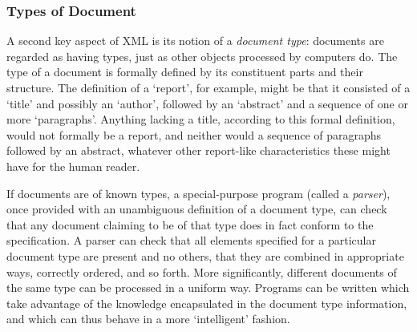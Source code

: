 \subsubsection[{Types of Document}]{Types of Document}\label{SG112}\par
A second key aspect of XML is its notion of a \textit{document type}: documents are regarded as having types, just as other objects processed by computers do. The type of a document is formally defined by its constituent parts and their structure. The definition of a ‘report’, for example, might be that it consisted of a ‘title’ and possibly an ‘author’, followed by an ‘abstract’ and a sequence of one or more ‘paragraphs’. Anything lacking a title, according to this formal definition, would not formally be a report, and neither would a sequence of paragraphs followed by an abstract, whatever other report-like characteristics these might have for the human reader.\par
If documents are of known types, a special-purpose program (called a \textit{parser}), once provided with an unambiguous definition of a document type, can check that any document claiming to be of that type does in fact conform to the specification. A parser can check that all elements specified for a particular document type are present and no others, that they are combined in appropriate ways, correctly ordered, and so forth. More significantly, different documents of the same type can be processed in a uniform way. Programs can be written which take advantage of the knowledge encapsulated in the document type information, and which can thus behave in a more ‘intelligent’ fashion.
